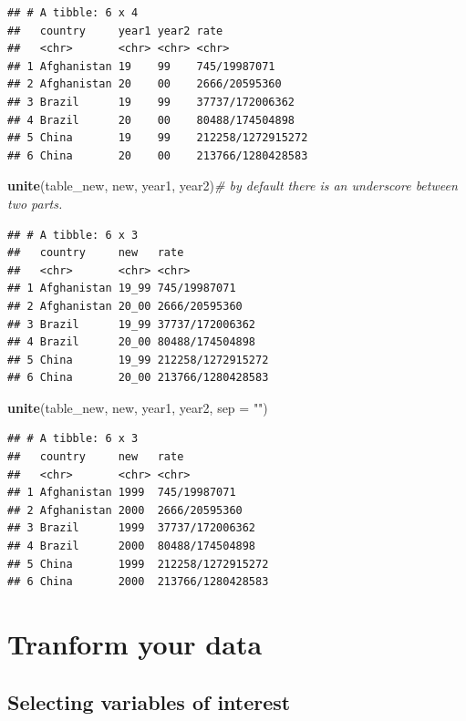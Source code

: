 \documentclass[]{book}
\newenvironment{Shaded}{\begin{snugshade}}{\end{snugshade}}
\newcommand{\KeywordTok}[1]{\textcolor[rgb]{0.13,0.29,0.53}{\textbf{#1}}}
\newcommand{\DataTypeTok}[1]{\textcolor[rgb]{0.13,0.29,0.53}{#1}}
\newcommand{\StringTok}[1]{\textcolor[rgb]{0.31,0.60,0.02}{#1}}
\newcommand{\CommentTok}[1]{\textcolor[rgb]{0.56,0.35,0.01}{\textit{#1}}}
\newcommand{\NormalTok}[1]{#1}
\begin{document}
\begin{verbatim}
## # A tibble: 6 x 4
##   country     year1 year2 rate             
##   <chr>       <chr> <chr> <chr>            
## 1 Afghanistan 19    99    745/19987071     
## 2 Afghanistan 20    00    2666/20595360    
## 3 Brazil      19    99    37737/172006362  
## 4 Brazil      20    00    80488/174504898  
## 5 China       19    99    212258/1272915272
## 6 China       20    00    213766/1280428583
\end{verbatim}

\begin{Shaded}
\begin{Highlighting}[]
\KeywordTok{unite}\NormalTok{(table_new, new, year1, year2)}\CommentTok{# by default there is an underscore between two parts.}
\end{Highlighting}
\end{Shaded}

\begin{verbatim}
## # A tibble: 6 x 3
##   country     new   rate             
##   <chr>       <chr> <chr>            
## 1 Afghanistan 19_99 745/19987071     
## 2 Afghanistan 20_00 2666/20595360    
## 3 Brazil      19_99 37737/172006362  
## 4 Brazil      20_00 80488/174504898  
## 5 China       19_99 212258/1272915272
## 6 China       20_00 213766/1280428583
\end{verbatim}

\begin{Shaded}
\begin{Highlighting}[]
\KeywordTok{unite}\NormalTok{(table_new, new, year1, year2, }\DataTypeTok{sep =} \StringTok{""}\NormalTok{)}
\end{Highlighting}
\end{Shaded}

\begin{verbatim}
## # A tibble: 6 x 3
##   country     new   rate             
##   <chr>       <chr> <chr>            
## 1 Afghanistan 1999  745/19987071     
## 2 Afghanistan 2000  2666/20595360    
## 3 Brazil      1999  37737/172006362  
## 4 Brazil      2000  80488/174504898  
## 5 China       1999  212258/1272915272
## 6 China       2000  213766/1280428583
\end{verbatim}

\chapter{Tranform your data}\label{tranform-your-data}

\section{Selecting variables of
interest}\label{selecting-variables-of-interest}
\end{document}
